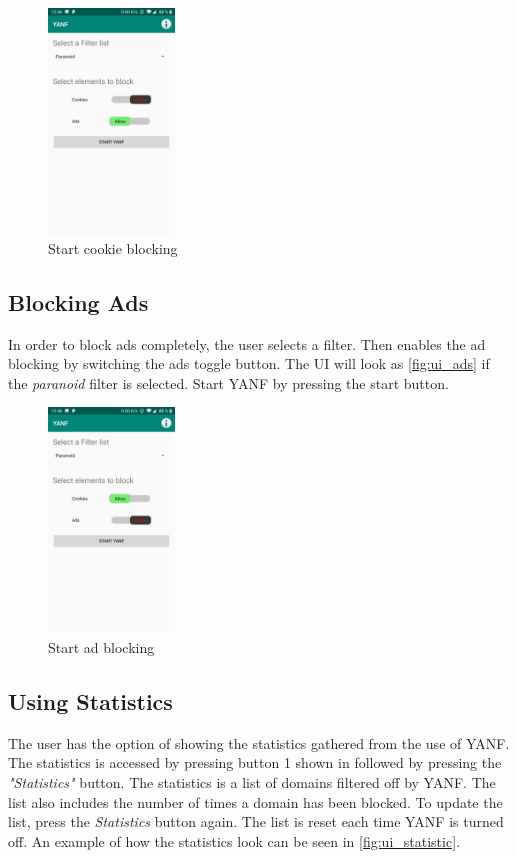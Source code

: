 \documentclass[main.tex]{subfiles}
\begin{document}
\begin{figure}[H]
    \centering
    \includegraphics[width=0.3\textwidth]{1_Appendix/UI/cookie_on.jpg}
    \caption{Start cookie blocking}
    \label{fig:ui_cookie}
\end{figure}


\subsection{Blocking Ads}
\label{UG-BlockingAds}
In order to block ads completely, the user selects a filter. Then enables the ad blocking by switching the ads toggle button. The UI will look as \autoref{fig:ui_ads} if the \textit{paranoid} filter is selected. Start YANF by pressing the start button.

\begin{figure}[H]
    \centering
    \includegraphics[width=0.3\textwidth]{1_Appendix/UI/ads_on.jpg}
    \caption{Start ad blocking}
    \label{fig:ui_ads}
\end{figure}

\subsection{Using Statistics}
\label{UG-Statistics}
The user has the option of showing the statistics gathered from the use of YANF. The statistics is accessed by pressing button 1 shown in  followed by pressing the \textit{"Statistics"} button. The statistics is a list of domains filtered off by YANF. The list also includes the number of times a domain has been blocked. To update the list, press the \textit{Statistics} button again. The list is reset each time YANF is turned off. An example of how the statistics look can be seen in \autoref{fig:ui_statistic}.
\end{document}
